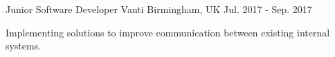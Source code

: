 

\begin{cventries}

  \cventry
    {Junior Software Developer} %
    {Vanti} %
    {Birmingham, UK} %
    {Jul. 2017 - Sep. 2017} %
    {
      \begin{cvitems} %
        \item {Implementing solutions to improve communication between existing internal systems.}
      \end{cvitems}
    }

\end{cventries}
